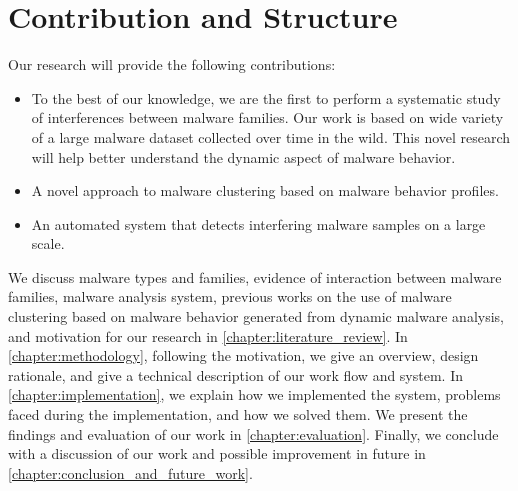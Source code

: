\section{Contribution and Structure}
\label{sec:contributionstructure}
Our research will provide the following contributions:
\begin{itemize}
  \item To the best of our knowledge, we are the first to perform a systematic study of interferences between malware families.
    Our work is based on wide variety of a large malware dataset collected over time in the wild.
    This novel research will help better understand the dynamic aspect of malware behavior.
  \item A novel approach to malware clustering based on malware behavior profiles.
  \item An automated system that detects interfering malware samples on a large scale.
\end{itemize}
We discuss malware types and families, evidence of interaction between malware families, malware analysis system, previous works on the use of malware clustering based on malware behavior generated from dynamic malware analysis, and motivation for our research in \autoref{chapter:literature_review}.
In \autoref{chapter:methodology}, following the motivation, we give an overview, design rationale, and give a technical description of our work flow and system.
In \autoref{chapter:implementation}, we explain how we implemented the system, problems faced during the implementation, and how we solved them.
We present the findings and evaluation of our work in \autoref{chapter:evaluation}.
Finally, we conclude with a discussion of our work and possible improvement in future in \autoref{chapter:conclusion_and_future_work}.
